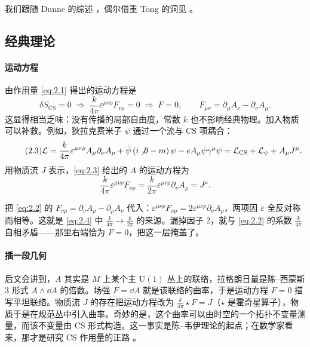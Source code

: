 我们跟随 Dunne 的综述 \cite{dunne}，偶尔借重 Tong 的洞见 \cite{tong_gauge,tong_qhe}。

\subsection{经典理论}\label{sec:2.1}

\paragraph{运动方程} %
由作用量 \eqref{eq:2.1} 得出的运动方程是
\begin{equation}\tag{2.2}\label{eq:2.2}
  \delta S_{\mathrm{CS}} = 0 \;\Longrightarrow\; \frac{k}{4\pi}\varepsilon^{\mu\nu\rho}F_{\nu\rho} = 0
  \;\Longrightarrow\; F = 0, \qquad F_{\mu\nu} = \partial_\mu A_\nu - \partial_\nu A_\mu .
\end{equation}
这显得相当乏味：没有传播的局部自由度，常数 $k$ 也不影响经典物理。加入物质可以补救。例如，狄拉克费米子 $\psi$ 通过一个流与 CS 项耦合：
\begin{equation}\tag{2.3}\label{eq:2.3}
  \mathcal{L} = \frac{k}{4\pi}\varepsilon^{\mu\nu\rho}A_\mu\partial_\nu A_\rho
  + \bar{\psi}\left(i\not\partial - m\right)\psi
  - eA_\mu\bar{\psi}\gamma^\mu\psi
  = \mathcal{L}_{\mathrm{CS}} + \mathcal{L}_\psi + A_\mu J^\mu .
\end{equation}
用物质流 $J$ 表示，\eqref{eq:2.3} 给出的 $A$ 的运动方程为
\begin{equation}\tag{2.4}\label{eq:2.4}
  \frac{k}{4\pi}\varepsilon^{\mu\nu\rho}F_{\nu\rho}
  = \frac{k}{2\pi}\varepsilon^{\mu\nu\rho}\partial_\nu A_\rho = J^\mu .
\end{equation}

\begin{yizhu}[易错点]
把 \eqref{eq:2.2} 的 $F_{\nu\rho}=\partial_\nu A_\rho-\partial_\rho A_\nu$ 代入：$\varepsilon^{\mu\nu\rho}F_{\nu\rho}=2\varepsilon^{\mu\nu\rho}\partial_\nu A_\rho$，两项因 $\varepsilon$ 全反对称而相等。这就是 \eqref{eq:2.4} 中 $\frac{k}{4\pi}\to\frac{k}{2\pi}$ 的来源。漏掉因子 2，就与 \eqref{eq:2.2} 的系数 $\frac{k}{4\pi}$ 自相矛盾——那里右端恰为 $F=0$，把这一层掩盖了。
\end{yizhu}

\paragraph{插一段几何} %
后文会讲到，$A$ 其实是 $M$ 上某个主 $\mathrm{U}(1)$ 丛上的联络，拉格朗日量是陈--西蒙斯 3 形式 $A\wedge\dd A$ 的倍数。场强 $F=\dd A$ 就是该联络的曲率，于是运动方程 $F=0$ 描写平坦联络。物质流 $J$ 的存在把运动方程改为 $\frac{k}{4\pi}\star F=J$（$\star$ 是霍奇星算子），物质于是在规范丛中引入曲率。奇妙的是，这个曲率可以由时空的一个拓扑不变量测量，而该不变量由 CS 形式构造。这一事实是陈--韦伊理论的起点；在数学家看来，那才是研究 CS 作用量的正路 \cite{chern1974}。

